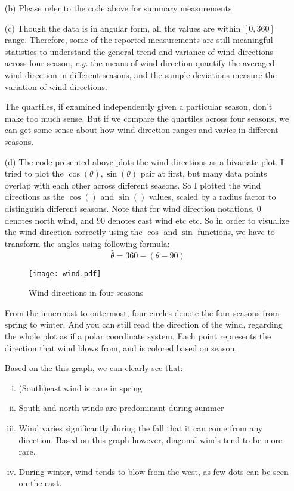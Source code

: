 \documentclass[letter]{article}
\begin{document}
    \begin{enumerate}
        \item[(b)] Please refer to the code above for summary measurements.
        \item[(c)] Though the data is in angular form, all the values are
        within $[0, 360]$ range. Therefore, some of the reported measurements are still
        meaningful statistics to understand the general trend and variance of
        wind directions across four season, \emph{e.g.} the means of wind
        direction quantify the averaged wind direction in different seasons,
        and the sample deviations measure the variation of wind directions. 

        The quartiles, if examined independently given a particular season,
        don't make too much sense. But if we compare the quartiles across four
        seasons, we can get some sense about how wind direction ranges and varies in
        different seasons.
        \item[(d)]
        The code presented above plots the wind directions as a bivariate plot. 
        I tried to plot the $\cos(\theta), \sin(\theta)$ pair at first, but
        many data points overlap with each other across different seasons. So I
        plotted the wind directions as the $\cos()$ and $\sin()$ values, scaled
        by a radius factor to distinguish different seasons.
        Note that for wind direction notations, 0 denotes north wind, and 90
        denotes east wind etc etc. So in order to visualize the wind direction
        correctly using the $\cos$ and $\sin$ functions, we have to transform
        the angles using following formula:
        \[
        \hat \theta = 360-(\theta-90)
        \]

        \begin{figure}[htp]
        \centering
        \texttt{[image: wind.pdf]}
        \caption{Wind directions in four seasons}
        \end{figure}

        From the innermost to outermost, four circles denote the four seasons
        from spring to winter. And you can still read the direction of the
        wind, regarding the whole plot as if a polar coordinate system. Each
        point represents the direction that wind blows from, and is colored
        based on season.

        Based on the this graph, we can clearly see that:
        \begin{enumerate}[i)]
        \item (South)east wind is rare in spring
        \item South and north winds are predominant during summer
        \item Wind varies significantly during the fall that it can come from
        any direction. Based on this graph however, diagonal winds tend to be
        more rare.
        \item During winter, wind tends to blow from the west, as few dots can
        be seen on the east.
        \end{enumerate}
    \end{enumerate}
    

    
\end{document}
